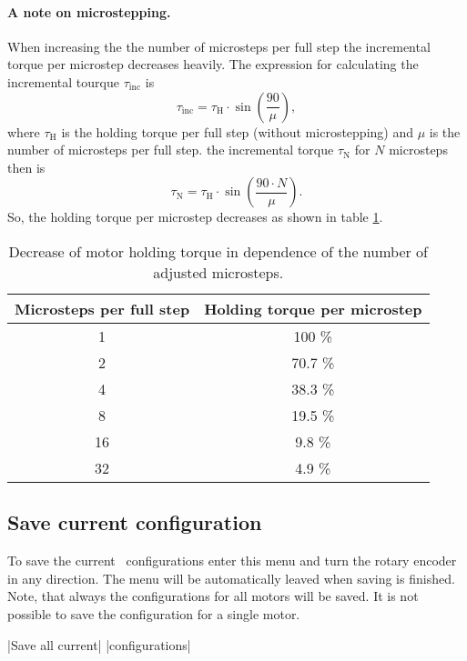 \paragraph{A note on microstepping.}
When increasing the the number of microsteps per full step the incremental
torque per microstep decreases heavily. The expression for calculating
the incremental tourque $\tau_{\text{inc}}$ is
\begin{equation*}
  \tau_{\text{inc}} = \tau_{\text{H}} \cdot \sin \left( \frac{90}{\mu} \right),
\end{equation*}
where $\tau_{\text{H}}$ is the holding torque per full step (without
microstepping) and $\mu$ is the number of microsteps per full step.
the incremental torque $\tau_{\text{N}}$ for $N$ microsteps then is
\begin{equation*}
  \tau_{\text{N}} = \tau_{\text{H}} \cdot \sin \left( \frac{90\cdot N}{\mu} \right).
\end{equation*}
So, the holding torque per microstep decreases as shown in
table \ref{tab:microstepping_holding_torque}.
\begin{table}
  \centering
  \begin{tabular}{cc}
    \toprule
    \textbf{Microsteps per full step} & \textbf{Holding torque per microstep} \\
    \toprule
    1 & 100 \% \\ \midrule
    2 & 70.7 \%\\ \midrule
    4 & 38.3 \% \\ \midrule
    8 & 19.5 \% \\ \midrule
    16 & 9.8 \% \\ \midrule
    32 & 4.9 \% \\
    \bottomrule
  \end{tabular}
  \caption{Decrease of motor holding torque in dependence of the number of
           adjusted microsteps.}
  \label{tab:microstepping_holding_torque}
\end{table}



\subsection{Save current configuration}
\label{menu_save}
To save the current \productName ~configurations enter this menu and
turn the rotary encoder in any direction. The menu will be automatically
leaved when saving is finished.\\
Note, that always the configurations for all motors will be saved. It is not
possible to save the configuration for a single motor.
\begin{center}
  |Save all current|
             |configurations|
\end{center}


